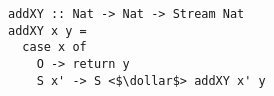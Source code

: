 \begin{figure}[!t]
  \centering
  \begin{minipage}{\columnwidth}
    \begin{lstlisting}[label={add_x_y_stream}, caption={Using streams in a function for \lstinline{addo in in out} direction}, captionpos=b, frame=tb]
addXY :: Nat -> Nat -> Stream Nat
addXY x y =
  case x of
    O -> return y
    S x' -> S <$\dollar$> addXY x' y
    \end{lstlisting}
  \end{minipage}
\end{figure}
